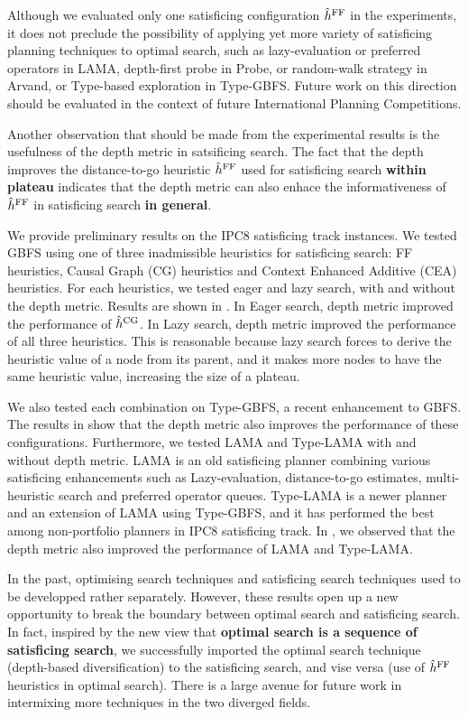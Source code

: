 Although we evaluated only one \sota satisficing configuration $\hat{h}^{\text{FF}}$ in
the experiments, it does not preclude the possibility of applying yet
more variety of satisficing planning techniques to optimal search, such as lazy-evaluation
or preferred operators in LAMA, depth-first probe in Probe, or
random-walk strategy in Arvand, or Type-based exploration in Type-GBFS.
Future work on this direction should be evaluated in the context of
future International Planning Competitions.

Another observation that should be made from the experimental results
is the usefulness of the depth metric in satsificing search.  The fact
that the depth improves the distance-to-go \ff heuristic $\hat{h}^{\text{FF}}$
used for satisficing search \textbf{within plateau} indicates that the depth
metric can also enhace the informativeness of $\hat{h}^{\text{FF}}$ in
satisficing search \textbf{in general}.

We provide preliminary results on the IPC8 satisficing track
instances. We tested GBFS using one of three \sota inadmissible heuristics for
satisficing search: 
FF heuristics\cite{Hoffmann01},
Causal Graph (CG) heuristics \cite{Helmert2006} and
Context Enhanced Additive (CEA) heuristics\cite{helmert2008unifying}.
For each heuristics, we tested 
eager and lazy search, with and without the depth metric.
Results are shown in . In Eager search, depth metric
improved the performance of $\hat{h}^{\text{CG}}$. In Lazy search, depth metric
improved the performance of all three heuristics. This is reasonable
because lazy search forces to derive the heuristic value of a node from
its parent, and it makes more nodes to have the same heuristic value,
increasing the size of a plateau.

We also tested each combination on Type-GBFS, a recent \sota enhancement
to GBFS. The results in  show that the depth
metric also improves the performance of these configurations. Furthermore, we tested LAMA and
Type-LAMA with and without depth metric. LAMA is an old \sota
satisficing planner combining various satisficing enhancements such as
Lazy-evaluation, distance-to-go estimates, multi-heuristic search and
preferred operator queues. Type-LAMA is a newer \sota planner and an
extension of LAMA using Type-GBFS, and it has performed the best among non-portfolio
planners in IPC8 satisficing track. In , we observed
that the depth metric also improved the performance of LAMA and Type-LAMA.

In the past, optimising search
techniques and satisficing search
techniques used to be
developped rather separately. However,
these results open up a new opportunity to break the boundary between
optimal search and satisficing search. In fact, inspired by the new
view that \textbf{optimal search is a sequence of satisficing
search}, we successfully imported the optimal search technique
(depth-based diversification) to the satisficing search, and vise versa
(use of $\hat{h}^{\text{FF}}$ heuristics in optimal search).
There is a large avenue for future work in 
intermixing more techniques in the two diverged fields.

